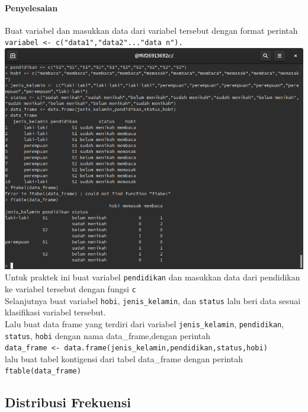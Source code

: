 \documentclass[a4paper,12pt]{article}
\begin{document}
\paragraph{Penyelesaian\\}
Buat variabel dan masukkan data dari variabel tersebut dengan format perintah \texttt{variabel <- c("data1","data2"..."data n").}\\
\includegraphics[width=\linewidth]{2}
Untuk praktek ini buat variabel \texttt{pendidikan} dan masukkan data dari pendidikan ke variabel tersebut dengan fungsi \texttt{c}\\
Selanjutnya buat variabel \texttt{hobi}, \texttt{jenis\_kelamin}, dan \texttt{status} lalu beri data sesuai klasifikasi variabel tersebut.\\
Lalu buat data frame yang terdiri dari variabel \texttt{jenis\_kelamin}, \texttt{pendidikan}, \texttt{status}, \texttt{hobi} dengan nama data\_frame,dengan perintah\\ 
\texttt{data\_frame <- data.frame(jenis\_kelamin,pendidikan,status,hobi)}\\
lalu buat tabel kontigensi dari tabel data\_frame dengan perintah\\
\texttt{ftable(data\_frame)}

\subsection{Distribusi Frekuensi}
\end{document}
